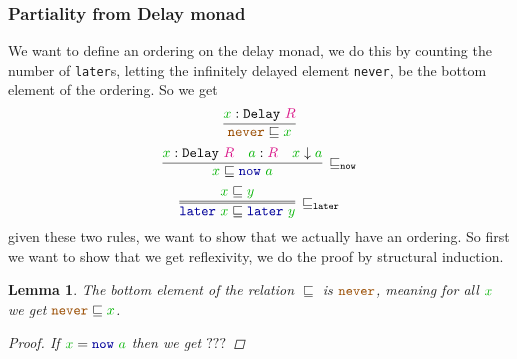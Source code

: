 \documentclass[twoside,11pt,openright]{report}
\theoremstyle{plain} %
\newtheorem{lem}[thm]{Lemma}
\theoremstyle{definition}
\theoremstyle{remark}
\newcommand*{\term}[1]{\textcolor{green!70!black}{#1}} %
\newcommand*{\type}[1]{\textcolor{magenta!90!black}{#1}}
\newcommand*{\universe}[1]{\textcolor{orange!80!black}{#1}}
\newcommand*{\unit}{\type{\textbf{1}}}
\newcommand*{\constant}[1]{\textcolor{orange!60!black}{\ensuremath{\mathtt{#1}}}}
\newcommand*{\function}[1]{\textcolor{blue!60!black}{\ensuremath{\mathtt{#1}}}}
\newcommand*{\typeformer}[1]{\ensuremath{\mathtt{#1}}}
\begin{document}

\subsubsection{Partiality from Delay monad}
We want to define an ordering on the delay monad, we do this by counting the number of \texttt{later}s, letting the infinitely delayed element \texttt{never}, be the bottom element of the ordering. So we get
\begin{equation}
  \infer{\constant{never} \sqsubseteq \term{x}}{\term{x} : \typeformer{Delay}~\type{R}}
\end{equation}
\begin{equation}
  \infer[\sqsubseteq_{\mathtt{now}}]{\term{x} \sqsubseteq \function{now}~\term{a}}{\term{x} : \typeformer{Delay}~\type{R} & \term{a} : \type{R} & \term{x} \downarrow \term{a}}
\end{equation}
\begin{equation}
  \infer=[\sqsubseteq_{\mathtt{later}}]{\function{later}~\term{x} \sqsubseteq \function{later}~\term{y}}{\term{x} \sqsubseteq \term{y}}
\end{equation}
given these two rules, we want to show that we actually have an ordering. So first we want to show that we get reflexivity, we do the proof by structural induction.

\begin{lem}
  The bottom element of the relation \(\sqsubseteq\) is \(\constant{never}\), meaning for all \(\term{x}\) we get \(\constant{never} \sqsubseteq \term{x}\).
  \begin{proof}
    If \(\term{x} = \function{now}~\term{a}\) then we get \(???\)
  \end{proof}
\end{lem}
  
\end{document}
